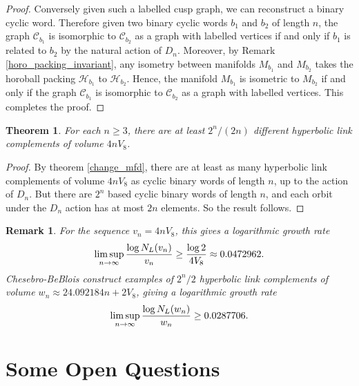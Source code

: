 \documentclass[reqno]{amsproc}  %
\newtheorem{thm}[prop]{\bf Theorem}
\newtheorem{rmk}[prop]{\bf Remark}
\begin{document}
\begin{proof}
\smallskip
Conversely given such a labelled cusp graph, we can reconstruct a binary cyclic word.
Therefore given two binary cyclic words $b_1$ and $b_2$ of length $n$,  the graph $\mathcal{C}_{b_1}$ is isomorphic to 
$\mathcal{C}_{b_2}$ as a graph with labelled vertices if and only if $b_1$ is related to $b_2$ by the natural action of $D_{n}$.
Moreover, by Remark \ref{horo_packing_invariant}, any isometry between manifolds $M_{b_1}$ and $M_{b_2}$ takes
the horoball packing $\mathcal{H}_{b_1}$ to $\mathcal{H}_{b_2}$.
Hence, the manifold $M_{b_1}$ is isometric to $M_{b_2}$ if and only if the graph $\mathcal{C}_{b_1}$ is isomorphic to $\mathcal{C}_{b_2}$ as a  graph with labelled vertices.
This completes the proof.
\end{proof}

\begin{thm}\label{thm.expo}
For each $n \ge 3$, there are at least $2^n/(2n)$ different hyperbolic 
link complements of volume $4nV_8$. 
\end{thm}
\begin{proof}
By theorem \ref{change_mfd}, there are at least as many hyperbolic link complements of volume $4nV_8$ as cyclic binary words of length $n$, up to the action of $D_n$. But there are $2^n$ based cyclic binary words of length $n$,
and each orbit under the $D_n$ action has at most $2n$ elements. So the result follows.
\end{proof}

\begin{rmk}
{\em For the sequence $v_n = 4nV_8$, this gives 
a logarithmic growth rate
$$\limsup_{n\to\infty} {\log  N_L(v_n) \over v_n} \ge
{\log 2 \over 4 V_8} \approx 0.0472962 .$$
Chesebro-BeBlois \cite{CD} construct examples of $2^n/2$
hyperbolic link complements of volume $w_n \approx 24.092184n + 2V_8$,
giving 
a logarithmic growth rate
$$\limsup_{n\to\infty} {\log  N_L(w_n) \over w_n} 
 \ge 0.0287706 .$$
}
\end{rmk}

\section{Some Open Questions} 
\end{document}
